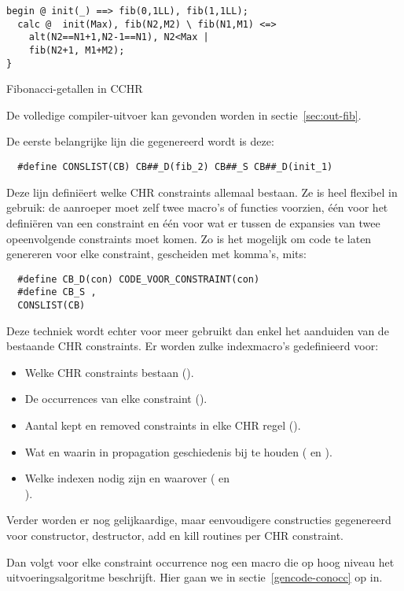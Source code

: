 {\begin{exCode}
\begin{Verbatim}[frame=single]
  begin @ init(_) ==> fib(0,1LL), fib(1,1LL);
  calc @  init(Max), fib(N2,M2) \ fib(N1,M1) <=>
    alt(N2==N1+1,N2-1==N1), N2<Max |
    fib(N2+1, M1+M2);
}
\end{Verbatim}
\caption{Fibonacci-getallen in CCHR}
\label{code:fib-cchr}
\end{exCode}
De volledige compiler-uitvoer kan gevonden worden in sectie~\ref{sec:out-fib}.

De eerste belangrijke lijn die gegenereerd wordt is deze: 
\begin{Verbatim}
  #define CONSLIST(CB) CB##_D(fib_2) CB##_S CB##_D(init_1)
\end{Verbatim}
Deze lijn defini\"eert welke CHR constraints allemaal bestaan. Ze is heel flexibel in gebruik: de aanroeper moet zelf twee macro's of functies voorzien, \'e\'en voor het defini\"eren van een constraint en \'e\'en voor wat er tussen de expansies van twee opeenvolgende constraints moet komen. Zo is het mogelijk om code te laten genereren voor elke constraint, gescheiden met komma's, mits: \begin{Verbatim}
  #define CB_D(con) CODE_VOOR_CONSTRAINT(con)
  #define CB_S ,
  CONSLIST(CB)
\end{Verbatim}

Deze techniek wordt echter voor meer gebruikt dan enkel het aanduiden van de bestaande CHR constraints. Er worden zulke indexmacro's gedefinieerd voor: \begin{itemize}
\item Welke CHR constraints bestaan ().
\item De occurrences van elke constraint ().
\item Aantal kept en removed constraints in elke CHR regel ().
\item Wat en waarin in propagation geschiedenis bij te houden ( en ).
\item Welke indexen nodig zijn en waarover ( en \\ ).
\end{itemize}
Verder worden er nog gelijkaardige, maar eenvoudigere constructies gegenereerd voor constructor, destructor, add en kill routines per CHR constraint.

Dan volgt voor elke constraint occurrence nog een macro die op hoog niveau het uitvoeringsalgoritme beschrijft. Hier gaan we in sectie~\ref{gencode-conocc} op in.

}
